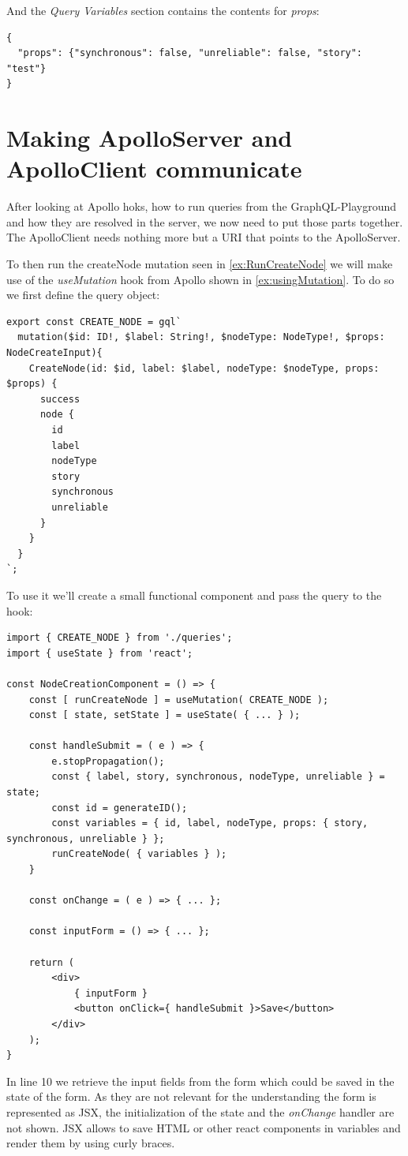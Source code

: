 And the \emph{Query Variables} section contains the contents for \emph{props}:
\begin{lstlisting}[caption={Query Variables}]
{
  "props": {"synchronous": false, "unreliable": false, "story": "test"}
}
\end{lstlisting}

\section{Making ApolloServer and ApolloClient communicate}
After looking at Apollo hoks, how to run queries from the GraphQL-Playground and how they are resolved in the server, we now need to put those parts together. The ApolloClient needs nothing more but a URI that points to the ApolloServer.

To then run the createNode mutation seen in \autoref{ex:RunCreateNode} we will make use of the \emph{useMutation} hook from Apollo shown in \autoref{ex:usingMutation}. To do so we first define the query object:

\begin{lstlisting}[label={ex:DefQuery},caption={Mutation to Create a Node in the Database}]
export const CREATE_NODE = gql`
  mutation($id: ID!, $label: String!, $nodeType: NodeType!, $props: NodeCreateInput){
    CreateNode(id: $id, label: $label, nodeType: $nodeType, props: $props) {
      success
      node {
        id
        label
        nodeType
        story
        synchronous
        unreliable
      }
    }
  }
`;
\end{lstlisting}

To use it we'll create a small functional component and pass the query to the hook:

\lstset{language=JavaScript}
\begin{lstlisting}[caption={Using the Query in a Component}]
import { CREATE_NODE } from './queries';
import { useState } from 'react';

const NodeCreationComponent = () => {
	const [ runCreateNode ] = useMutation( CREATE_NODE );
	const [ state, setState ] = useState( { ... } );
	
	const handleSubmit = ( e ) => {
		e.stopPropagation();
		const { label, story, synchronous, nodeType, unreliable } = state; 
		const id = generateID();
		const variables = { id, label, nodeType, props: { story, synchronous, unreliable } }; 
		runCreateNode( { variables } );
	}

	const onChange = ( e ) => { ... };
	
	const inputForm = () => { ... };
	
	return (
		<div>
			{ inputForm }
			<button onClick={ handleSubmit }>Save</button>
		</div>	
	);
}
\end{lstlisting}
In line 10 we retrieve the input fields from the form which could be saved in the state of the form. As they are not relevant for the understanding the form is represented as JSX, the initialization of the state and the \emph{onChange} handler are not shown. JSX allows to save HTML or other react components in variables and render them by using curly braces.

